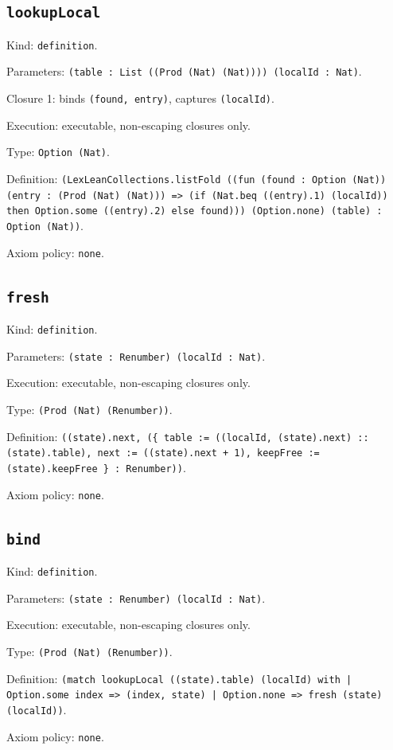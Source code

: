 \documentclass[11pt]{article}
\begin{document}
\subsection*{\texttt{lookupLocal}}
\noindent Kind: \texttt{definition}.\par
\noindent Parameters: \texttt{(table : List ((Prod (Nat) (Nat)))) (localId : Nat)}.\par
\noindent Closure 1: binds \texttt{(found, entry)}, captures \texttt{(localId)}.\par
\noindent Execution: executable, non-escaping closures only.\par
\noindent Type: \texttt{Option (Nat)}.\par
\noindent Definition: \texttt{(LexLeanCollections.listFold ((fun (found : Option (Nat)) (entry : (Prod (Nat) (Nat))) => (if (Nat.beq ((entry).1) (localId)) then Option.some ((entry).2) else found))) (Option.none) (table) : Option (Nat))}.\par
\noindent Axiom policy: \texttt{none}.\par
\subsection*{\texttt{fresh}}
\noindent Kind: \texttt{definition}.\par
\noindent Parameters: \texttt{(state : Renumber) (localId : Nat)}.\par
\noindent Execution: executable, non-escaping closures only.\par
\noindent Type: \texttt{(Prod (Nat) (Renumber))}.\par
\noindent Definition: \texttt{((state).next, (\{ table := ((localId, (state).next) :: (state).table), next := ((state).next + 1), keepFree := (state).keepFree \} : Renumber))}.\par
\noindent Axiom policy: \texttt{none}.\par
\subsection*{\texttt{bind}}
\noindent Kind: \texttt{definition}.\par
\noindent Parameters: \texttt{(state : Renumber) (localId : Nat)}.\par
\noindent Execution: executable, non-escaping closures only.\par
\noindent Type: \texttt{(Prod (Nat) (Renumber))}.\par
\noindent Definition: \texttt{(match lookupLocal ((state).table) (localId) with | Option.some index => (index, state) | Option.none => fresh (state) (localId))}.\par
\noindent Axiom policy: \texttt{none}.\par
\end{document}
